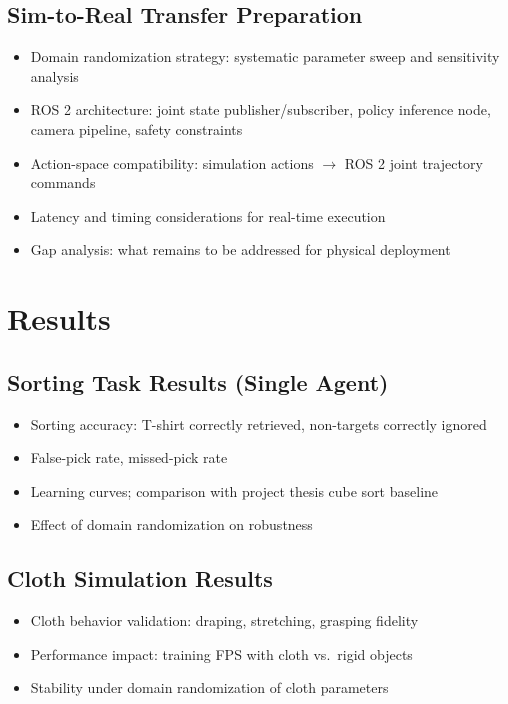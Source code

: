 \section{Sim-to-Real Transfer Preparation}
\begin{itemize}
    \item Domain randomization strategy: systematic parameter sweep and sensitivity analysis
    \item ROS 2 architecture: joint state publisher/subscriber, policy inference node, camera pipeline, safety constraints
    \item Action-space compatibility: simulation actions $\rightarrow$ ROS 2 joint trajectory commands
    \item Latency and timing considerations for real-time execution
    \item Gap analysis: what remains to be addressed for physical deployment
\end{itemize}

\chapter{Results}\label{ch:results}

\section{Sorting Task Results (Single Agent)}
\begin{itemize}
    \item Sorting accuracy: T-shirt correctly retrieved, non-targets correctly ignored
    \item False-pick rate, missed-pick rate
    \item Learning curves; comparison with project thesis cube sort baseline
    \item Effect of domain randomization on robustness
\end{itemize}

\section{Cloth Simulation Results}
\begin{itemize}
    \item Cloth behavior validation: draping, stretching, grasping fidelity
    \item Performance impact: training FPS with cloth vs.\ rigid objects
    \item Stability under domain randomization of cloth parameters
\end{itemize}


